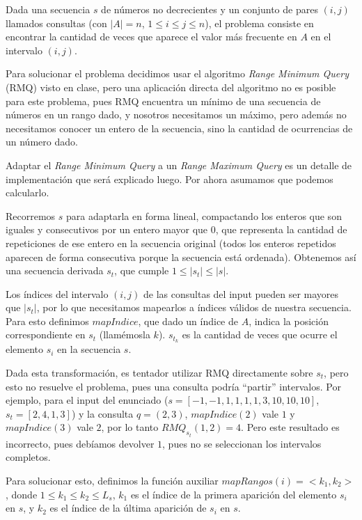 Dada una secuencia $s$ de números no decrecientes y un conjunto de pares
$(i,j)$ llamados consultas (con $|A|=n$, $1 \le i \le j \le n$), el problema
consiste en encontrar la cantidad de veces que aparece el valor más frecuente
en $A$ en el intervalo $(i,j)$.

Para solucionar el problema decidimos usar el algoritmo {\sl Range Minimum
Query} (RMQ) visto en clase, pero una aplicación directa del algoritmo no es
posible para este problema, pues RMQ encuentra un mínimo de una secuencia
de números en un rango dado, y nosotros necesitamos un máximo, pero
además no necesitamos conocer un entero de la secuencia, sino la cantidad
de ocurrencias de un número dado.

Adaptar el {\sl Range Minimum Query} a un {\sl Range Maximum Query} es un
detalle de implementación que será explicado luego. Por ahora asumamos
que podemos calcularlo.

Recorremos $s$ para adaptarla en forma lineal, compactando los enteros que
son iguales y consecutivos por un entero mayor que $0$, que representa la
cantidad de repeticiones de ese entero en la secuencia original (todos los
enteros repetidos aparecen de forma consecutiva porque la secuencia está
ordenada). Obtenemos así una secuencia derivada $s_t$, que cumple
$1 \le |s_t| \le |s|$.

Los índices del intervalo $(i,j)$ de las consultas del input pueden ser
mayores que $|s_t|$, por lo que necesitamos mapearlos a índices válidos de
nuestra secuencia. Para esto definimos $mapIndice$, que dado un índice de $A$,
indica la posición correspondiente en $s_t$ (llamémosla $k$). $s_{t_k}$
es la cantidad de veces que ocurre el elemento $s_i$ en la secuencia $s$.

Dada esta transformación, es tentador utilizar RMQ directamente sobre $s_t$,
pero esto no resuelve el problema, pues una consulta podría ``partir''
intervalos. Por ejemplo, para el input del enunciado ($s = [-1, -1, 1,
1, 1, 1, 3, 10, 10, 10]$, $s_t = [2, 4, 1, 3]$) y la consulta $q=(2,3)$,
$mapIndice(2)$ vale $1$ y $mapIndice(3)$ vale $2$, por lo tanto $RMQ_{s_t}(1,2)
=4$. Pero este resultado es incorrecto, pues debíamos devolver $1$, pues
no se seleccionan los intervalos completos.

Para solucionar esto, definimos la función auxiliar $mapRangos(i) = <k_1,k_2>$,
donde $1 \le k_1 \le k_2 \le L_s$, $k_1$ es el índice de la primera aparición
del elemento $s_i$ en $s$, y $k_2$ es el índice de la última aparición de $s_i$ en $s$.

